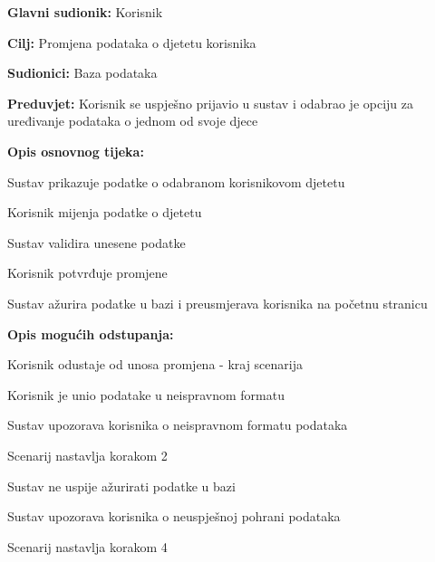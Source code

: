 					\noindent {}
					\begin{packed_item}
	
						\item \textbf{Glavni sudionik: }Korisnik
						\item  \textbf{Cilj:} Promjena podataka o djetetu korisnika
						\item  \textbf{Sudionici:} Baza podataka
						\item  \textbf{Preduvjet:} Korisnik se uspješno prijavio u sustav i odabrao je opciju za uređivanje podataka o jednom od svoje djece
						\eject
						\item  \textbf{Opis osnovnog tijeka:}
						
						\item[] \begin{packed_enum}
							\item Sustav prikazuje podatke o odabranom korisnikovom djetetu
							\item Korisnik mijenja podatke o djetetu
							\item Sustav validira unesene podatke
							\item Korisnik potvrđuje promjene
							\item Sustav ažurira podatke u bazi i preusmjerava korisnika na početnu stranicu
						\end{packed_enum}

						\item  \textbf{Opis mogućih odstupanja:}

						\item[] \begin{packed_item}
							\item[2.a] Korisnik odustaje od unosa promjena - kraj scenarija
							\item[3.a] Korisnik je unio podatake u neispravnom formatu
							\item[] \begin{packed_enum}
								\item Sustav upozorava korisnika o neispravnom formatu podataka
								\item Scenarij nastavlja korakom 2 
							\end{packed_enum}	
							\item[5.a] Sustav ne uspije ažurirati podatke u bazi
							\item[] \begin{packed_enum}
								\item Sustav upozorava korisnika o neuspješnoj pohrani podataka
								\item Scenarij nastavlja korakom 4
							\end{packed_enum}					
						\end{packed_item}
					\end{packed_item}
					
